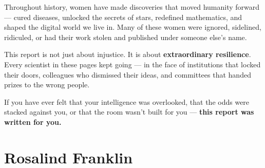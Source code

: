 \documentclass[12pt,a4paper]{article}
\begin{document}
\begin{tcolorbox}[motivationbox, title={A Message to Every Student Reading This}]
Throughout history, women have made discoveries that moved humanity forward — cured diseases, unlocked the secrets of stars, redefined mathematics, and shaped the digital world we live in. Many of these women were ignored, sidelined, ridiculed, or had their work stolen and published under someone else's name.

This report is not just about injustice. It is about \textbf{extraordinary resilience}. Every scientist in these pages kept going — in the face of institutions that locked their doors, colleagues who dismissed their ideas, and committees that handed prizes to the wrong people.

If you have ever felt that your intelligence was overlooked, that the odds were stacked against you, or that the room wasn't built for you — \textbf{this report was written for you.}
\end{tcolorbox}

\vspace{8pt}

\newpage

\section{Rosalind Franklin}
\end{document}
